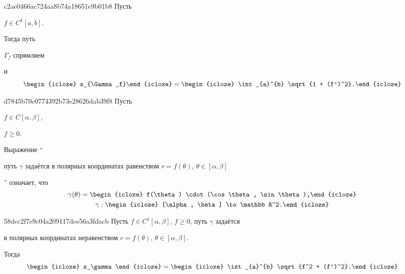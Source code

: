 \begin{note}{c2ae0466ac724aa8b74a18651e9b01b8}
    Пусть \begin{icloze}{3}\({ f \in C^{1}[a, b] }\).\end{icloze} Тогда путь \begin{icloze}{4}\({ \Gamma_f }\) спрямляем\end{icloze} и
    \[
        \begin{icloze}{2}s_{\Gamma_f}\end{icloze} = \begin{icloze}{1}\int_{a}^{b} \sqrt{1 + (f')^2}.\end{icloze}
    \]
\end{note}

\begin{note}{d7845b70c0774392b73e28626dab39f8}
    Пусть \begin{icloze}{3}\({ f \in C[\alpha, \beta] }\),\end{icloze} \begin{icloze}{4}\({ f \geqslant 0 }\).\end{icloze}
    Выражение ``\begin{icloze}{2}путь \({ \gamma }\) задаётся в полярных координатах равенством \({ r = f(\theta) }\),\: \({ \theta \in [\alpha, \beta] }\)\end{icloze}'' означает, что
    \[
        \begin{gathered}
            \gamma(\theta) = \begin{icloze}{1}f(\theta) \cdot (\cos \theta, \sin \theta),\end{icloze} \\
            \gamma : \begin{icloze}{5}[\alpha, \beta] \to \mathbb R^2.\end{icloze}
        \end{gathered}
    \]
\end{note}

\begin{note}{58dcc2f7e9c04a209117dce56a3fdacb}
    Пусть \({ f \in C^{1}[\alpha, \beta] }\), \({ f \geqslant 0 }\), путь \({ \gamma }\) задаётся \begin{icloze}{2}в полярных координатах неравенством \({ r = f(\theta) }\),\: \({ \theta \in [\alpha, \beta] }\).\end{icloze} Тогда
    \[
        \begin{icloze}{3}s_\gamma\end{icloze} = \begin{icloze}{1}\int_{a}^{b} \sqrt{f^2 + (f')^2}.\end{icloze}
    \]
\end{note}

